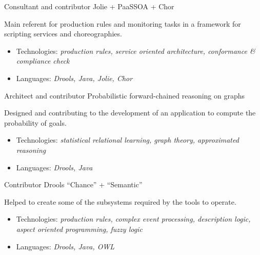%
{Consultant and contributor}%
{Jolie + PaaSSOA + Chor}{}{}{Main referent for production rules and monitoring tasks in a framework for scripting services and choreographies.\begin{itemize}
\item Technologies: \emph{production rules, service oriented architecture, conformance \& compliance check}
\item Languages: \emph{Drools, Java, Jolie, Chor}
\end{itemize}}

%
{Architect and contributor}%
{Probabilistic forward\--chained reasoning on graphs}{}{}{Designed and contributing to the development of an application to compute the probability of goals.\begin{itemize}
\item Technologies: \emph{statistical relational learning, graph theory, approximated reasoning}
\item Languages: \emph{Drools, Java}
\end{itemize}}

%
{Contributor}%
{Drools ``Chance'' + ``Semantic''}{}{}{Helped to create some of the subsystems required by the tools to operate.\begin{itemize}
\item Technologies: \emph{production rules, complex event processing, description logic, aspect oriented programming, fuzzy logic}
\item Languages: \emph{Drools, Java, OWL}
\end{itemize}}
